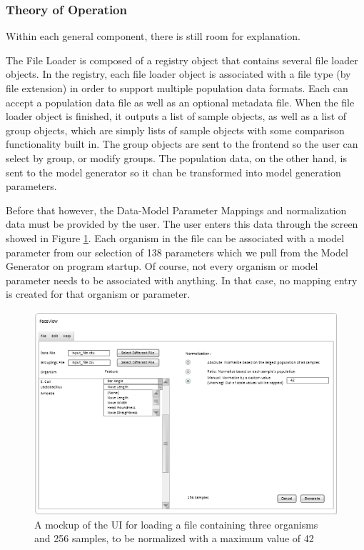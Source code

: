 \documentclass[letterpaper,10pt, onecolumn, draftclsnofoot]{IEEEtran}
\begin{document}
\subsubsection{Theory of Operation}
Within each general component, there is still room for explanation.

The File Loader is composed of a registry object that contains several file loader objects. In the registry, each file loader object is associated with a file type (by file extension) in order to support multiple population data formats. Each can accept a population data file as well as an optional metadata file. When the file loader object is finished, it outputs a list of sample objects, as well as a list of group objects, which are simply lists of sample objects with some comparison functionality built in. The group objects are sent to the frontend so the user can select by group, or modify groups. The population data, on the other hand, is sent to the model generator so it chan be transformed into model generation parameters.

Before that however, the Data-Model Parameter Mappings and normalization data must be provided by the user. The user enters this data through the screen showed in Figure \ref{fig:loadingmockup2}. Each organism in the file can be associated with a model parameter from our selection of 138 parameters which we pull from the Model Generator on program startup. Of course, not every organism or model parameter needs to be associated with anything. In that case, no mapping entry is created for that organism or parameter. 

\begin{figure}[h]
	\includegraphics[width=\textwidth]{loadMenu.PNG}
	\caption{A mockup of the UI for loading a file containing three organisms and 256 samples, to be normalized with a maximum value of 42}
	\label{fig:loadingmockup2}
\end{figure}
\end{document}
